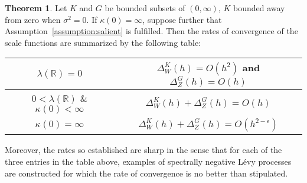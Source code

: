 \documentclass[pdftex,oneside,11pt,reqno]{amsart}
\theoremstyle{definition}
\theoremstyle{theorem}
\newtheorem{theorem}{Theorem}[section]
\theoremstyle{remark}
\numberwithin{equation}{section}
\numberwithin{definition}{section}
\begin{document}
\begin{theorem}\label{theorem:rates_for_scale_functions}
Let $K$ and $G$ be bounded subsets of $(0,\infty)$, $K$ bounded away from zero when ${\sigma^2}=0$. If $\kappa(0)=\infty$, suppose further that Assumption~\ref{assumption:salient} is fulfilled. Then the rates of convergence of the scale functions are summarized by the following table: 
\begin{center}
\begin{tabular}{|c|c|}\hline
${\lambda}(\mathbb{R})=0$ & $\Delta_W^K(h)=O(h^2)$ and $\Delta_Z^G(h)=O(h)$\\\hline
$0<{\lambda}(\mathbb{R})$ \& $\kappa(0)<\infty$ & $\Delta_W^K(h)+\Delta_Z^G(h)=O(h)$\\\hline
$\kappa(0)=\infty$ & $\Delta_W^K(h)+\Delta_Z^G(h)=O(h^{2-\epsilon})$\\\hline
\end{tabular}
\end{center}
Moreover, the rates so established are sharp in the sense that for each of the
three entries in the table above, examples of spectrally negative
L\'evy processes are constructed for which the rate of convergence is no better than 
stipulated.
\end{theorem}
\end{document}

